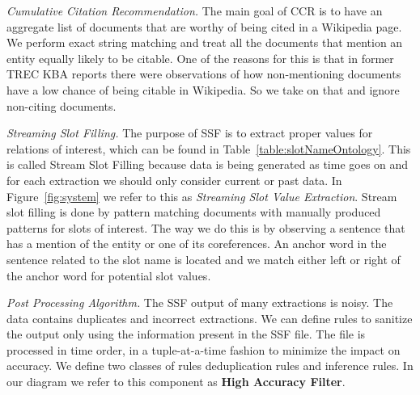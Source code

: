 \textit{Cumulative Citation Recommendation.}
The main goal of CCR is to have an aggregate list of documents that are worthy of being cited in a Wikipedia page. We perform exact string matching and treat all the documents that mention an entity equally likely to be citable. One of the reasons for this is that in former TREC KBA reports \cite{JFrank12} there were observations of how non-mentioning documents have a low chance of being citable in Wikipedia. So we take on that and ignore non-citing documents. 






\textit{Streaming Slot Filling.}
The purpose of SSF is to extract proper values for relations of interest, which can be found in Table~\ref{table:slotNameOntology}. This is called Stream Slot Filling because data is being generated as time goes
on and for each extraction we should only consider current or past data. In Figure~\ref{fig:system} we refer to this as \textit{Streaming Slot Value Extraction}. Stream slot filling is done by pattern matching documents with manually produced patterns for slots of interest. The way we do this is by observing a sentence that has a mention of the entity or one of its coreferences. An anchor word in the sentence related to the slot name is located and we match either left or right of the anchor word for potential slot values. 

\textit{Post Processing Algorithm.}
The SSF output of many extractions is noisy. The data contains duplicates and incorrect extractions. We can define rules to sanitize the output only using the information present in the SSF file. The file is processed in time order, in a tuple-at-a-time fashion to minimize the impact on accuracy. We define two classes of rules deduplication rules and inference rules. In our diagram we refer to this component as \textbf{High Accuracy Filter}.
